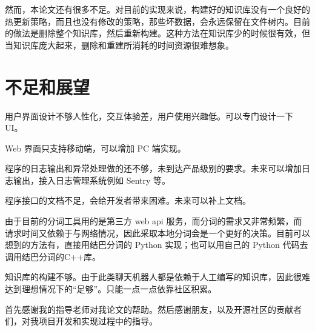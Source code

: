 \documentclass[bachelor,winfonts]{jnuthesis}
\begin{document}
然而，本论文还有很多不足。对目前的实现来说，构建好的知识库没有一个良好的热更新策略，而且也没有修改的策略，那些坏数据，会永远保留在文件树内。目前的做法是删除整个知识库，然后重新构建。这种方法在知识库少的时候很有效，但当知识库庞大起来，删除和重建所消耗的时间资源很难想象。

\section{不足和展望}

用户界面设计不够人性化，交互体验差，用户使用兴趣低。可以专门设计一下 UI。

Web 界面只支持移动端，可以增加 PC 端实现。

程序的日志输出和异常处理做的还不够，未到达产品级别的要求。未来可以增加日志输出，接入日志管理系统例如 Sentry 等。

程序接口的文档不足，会给开发者带来困难。未来可以补上文档。

由于目前的分词工具用的是第三方 web api 服务，而分词的需求又非常频繁，而请求时间又依赖于与网络情况，因此采取本地分词会是一个更好的决策。目前可以想到的方法有，直接用结巴分词的 Python 实现；也可以用自己的 Python 代码去调用结巴分词的C++库。

知识库的构建不够。由于此类聊天机器人都是依赖于人工编写的知识库，因此很难达到理想情况下的“足够”。只能一点一点依靠社区积累。

\begin{acknowledgement}
  首先感谢我的指导老师对我论文的帮助。然后感谢朋友，以及开源社区的贡献者们，对我项目开发和实现过程中的指导。
\end{acknowledgement}

\nocite{*}

\end{document}
